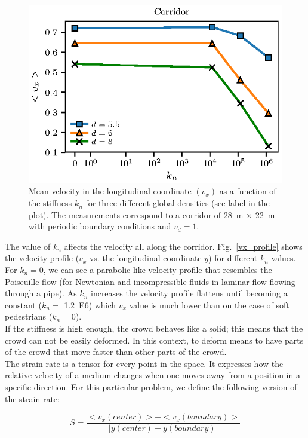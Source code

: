 \documentclass[preprint,12pt]{elsarticle}
\begin{document}
\begin{figure}[htbp!]
\centering
\includegraphics[width=0.7\columnwidth]{./kn_vs_vx_corridor.eps}
\caption{\label{kn_vs_vx_corridor} Mean velocity in the longitudinal coordinate $(v_x)$ as a function of the stiffness $k_n$ for three different global densities (see label in the plot). The measurements correspond to a corridor of 28~m $\times$ 22~m with periodic boundary conditions and $v_d=1$.      }
\end{figure}

The value of $k_n$ affects the velocity all along the corridor. Fig.~\ref{vx_profile} shows the velocity profile ($v_x$ vs. the longitudinal coordinate $y$) for different $k_n$ values. For $k_n=0$, we can see a parabolic-like velocity profile that resembles the Poiseuille flow (for Newtonian and incompressible fluids in laminar flow flowing through a pipe). As $k_n$ increases the velocity profile flattens until becoming a constant ($k_n=$ 1.2~E6) which $v_x$ value is much lower than on the case of soft pedestrians ($k_n=$0).\\

If the stiffness is high enough, the crowd behaves like a solid; this means that the crowd can not be easily deformed. In this context, to deform means to have parts of the crowd that move faster than other parts of the crowd. \\

The strain rate is a tensor for every point in the space. It expresses how the relative velocity of a medium changes when one moves away from a position in a specific direction. For this particular problem, we define the following version of the strain rate:

\begin{equation}
S = \frac{<v_x(center)> - <v_x(boundary)> }{\left | y(center) - y(boundary) \right |} 
\end{equation}
\end{document}
